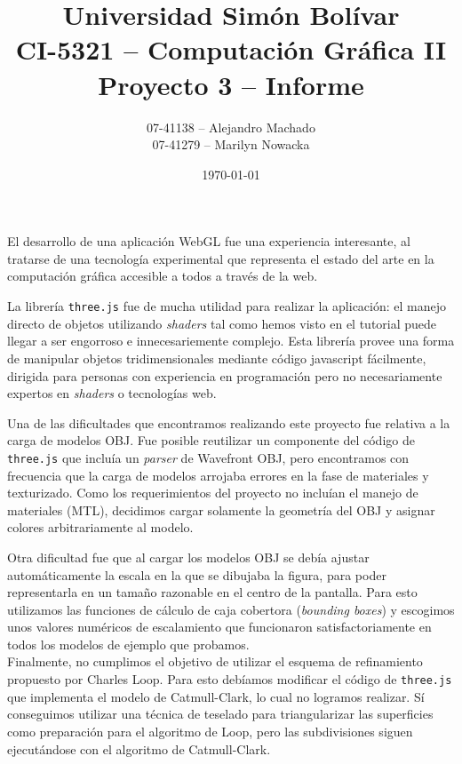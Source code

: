 \documentclass[letterpaper,12pt]{article}
\begin{document}
\title{\normalsize{Universidad Simón Bolívar\\ CI-5321 -- Computación Gráfica
II
\\ \textbf{Proyecto 3 -- Informe}\\}}
\author{\normalsize{07-41138 -- Alejandro Machado}\\ \normalsize{07-41279 --
Marilyn Nowacka}}
\date{\normalsize{\today}}
\maketitle

\thispagestyle{empty}
\pagestyle{empty}

El desarrollo de una aplicación WebGL fue una experiencia interesante, al
tratarse de una tecnología experimental que representa el estado del arte en la
computación gráfica accesible a todos a través de la web.

La librería \texttt{three.js} fue de mucha utilidad para realizar la
aplicación: el manejo directo de objetos utilizando \textit{shaders} tal como
hemos visto en el tutorial puede llegar a ser engorroso e innecesariemente
complejo. Esta librería provee una forma de manipular objetos tridimensionales
mediante código javascript fácilmente, dirigida para personas con
experiencia en programación pero no necesariamente expertos en \textit{shaders}
o tecnologías web.

Una de las dificultades que encontramos realizando este proyecto fue relativa a
la carga de modelos OBJ. Fue posible reutilizar un componente del código de
\texttt{three.js} que incluía un \textit{parser} de Wavefront OBJ, pero
encontramos con frecuencia que la carga de modelos arrojaba errores en la
fase de materiales y texturizado. Como los requerimientos del proyecto no incluían el
manejo de materiales (MTL), decidimos cargar solamente la geometría del OBJ y
asignar colores arbitrariamente al modelo.

Otra dificultad fue que al cargar los modelos OBJ se debía ajustar
automáticamente la escala en la que se dibujaba la figura, para poder
representarla en un tamaño razonable en el centro de la pantalla. Para esto
utilizamos las funciones de cálculo de caja cobertora (\textit{bounding boxes})
y escogimos unos valores numéricos de escalamiento que funcionaron
satisfactoriamente en todos los modelos de ejemplo que probamos.
\\

Finalmente, no cumplimos el objetivo de utilizar el esquema de
refinamiento propuesto por Charles Loop.  Para esto debíamos modificar el código 
de \texttt{three.js} que implementa el modelo de Catmull-Clark, lo cual no
logramos realizar. Sí conseguimos utilizar una técnica de teselado para triangularizar las
superficies como preparación para el algoritmo de Loop, pero las subdivisiones
siguen ejecutándose con el algoritmo de Catmull-Clark.
\end{document}
